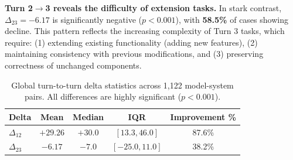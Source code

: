 \textbf{Turn 2$\to$3 reveals the difficulty of extension tasks.}
In stark contrast, $\Delta_{23} = -6.17$ is significantly negative ($p < 0.001$), with \textbf{58.5\%} of cases showing decline. This pattern reflects the increasing complexity of Turn 3 tasks, which require: (1) extending existing functionality (adding new features), (2) maintaining consistency with previous modifications, and (3) preserving correctness of unchanged components.

\begin{table}[htbp]
    \centering
    \caption{Global turn-to-turn delta statistics across 1,122 model-system pairs. All differences are highly significant ($p < 0.001$).}
    \label{tab:delta_global}
    \begin{tabular}{lcccc}
    \toprule
    \textbf{Delta} & \textbf{Mean} & \textbf{Median} & \textbf{IQR} & \textbf{Improvement \%} \\
    \midrule
    $\Delta_{12}$ & $+29.26 $ & $+30.0$ & $[13.3, 46.0]$ & 87.6\% \\
    $\Delta_{23}$ & $-6.17 $ & $-7.0$ & $[-25.0, 11.0]$ & 38.2\% \\
    \bottomrule
    \end{tabular}
\end{table}


